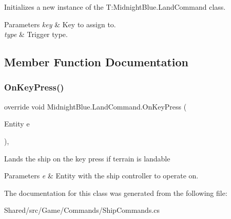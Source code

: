 Initializes a new instance of the T\+:\+Midnight\+Blue.\+Land\+Command class. 


\begin{DoxyParams}{Parameters}
{\em key} & Key to assign to.\\
\hline
{\em type} & Trigger type.\\
\hline
\end{DoxyParams}


\subsection{Member Function Documentation}
\hypertarget{class_midnight_blue_1_1_land_command_a2c496d96aed4498bb3ca133fcea4b172}{}\label{class_midnight_blue_1_1_land_command_a2c496d96aed4498bb3ca133fcea4b172} 
\subsubsection{\texorpdfstring{On\+Key\+Press()}{OnKeyPress()}}
{\footnotesize\ttfamily override void Midnight\+Blue.\+Land\+Command.\+On\+Key\+Press (\begin{DoxyParamCaption}\item[{Entity}]{e }\end{DoxyParamCaption})\hspace{0.3cm}{\ttfamily [inline]}, {\ttfamily [protected]}}



Lands the ship on the key press if terrain is landable 


\begin{DoxyParams}{Parameters}
{\em e} & Entity with the ship controller to operate on.\\
\hline
\end{DoxyParams}


The documentation for this class was generated from the following file\+:\begin{DoxyCompactItemize}
\item 
Shared/src/\+Game/\+Commands/Ship\+Commands.\+cs\end{DoxyCompactItemize}
